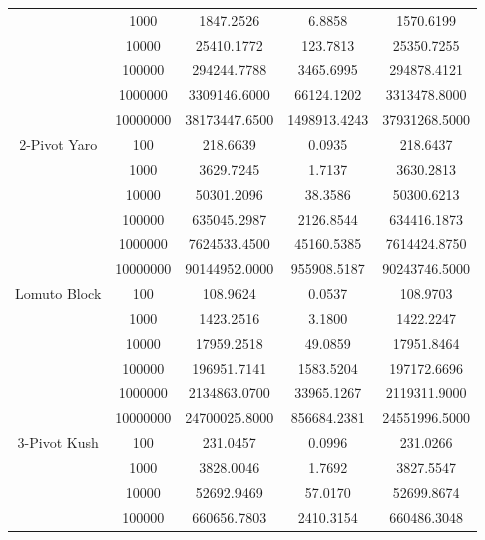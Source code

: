 \documentclass{article}
\begin{document}
\begin{center}
\begin{tabular}{ |c c | c c c| }
                        & 1000     & 1847.2526      & 6.8858        & 1570.6199 \\
                        & 10000    & 25410.1772     & 123.7813      & 25350.7255 \\
                        & 100000   & 294244.7788    & 3465.6995     & 294878.4121 \\
                        & 1000000  & 3309146.6000   & 66124.1202    & 3313478.8000 \\
                        & 10000000 & 38173447.6500  & 1498913.4243  & 37931268.5000 \\
        \hline
        2-Pivot Yaro    & 100      & 218.6639       & 0.0935        & 218.6437 \\
                        & 1000     & 3629.7245      & 1.7137        & 3630.2813 \\
                        & 10000    & 50301.2096     & 38.3586       & 50300.6213 \\
                        & 100000   & 635045.2987    & 2126.8544     & 634416.1873 \\
                        & 1000000  & 7624533.4500   & 45160.5385    & 7614424.8750 \\
                        & 10000000 & 90144952.0000  & 955908.5187   & 90243746.5000 \\
        Lomuto Block    & 100      & 108.9624       & 0.0537        & 108.9703 \\
                        & 1000     & 1423.2516      & 3.1800        & 1422.2247 \\
                        & 10000    & 17959.2518     & 49.0859       & 17951.8464 \\
                        & 100000   & 196951.7141    & 1583.5204     & 197172.6696 \\
                        & 1000000  & 2134863.0700   & 33965.1267    & 2119311.9000 \\
                        & 10000000 & 24700025.8000  & 856684.2381   & 24551996.5000 \\
        \hline
        3-Pivot Kush    & 100      & 231.0457       & 0.0996        & 231.0266 \\
                        & 1000     & 3828.0046      & 1.7692        & 3827.5547 \\
                        & 10000    & 52692.9469     & 57.0170       & 52699.8674 \\
                        & 100000   & 660656.7803    & 2410.3154     & 660486.3048 \\

\end{tabular}
\end{center}
\end{document}
